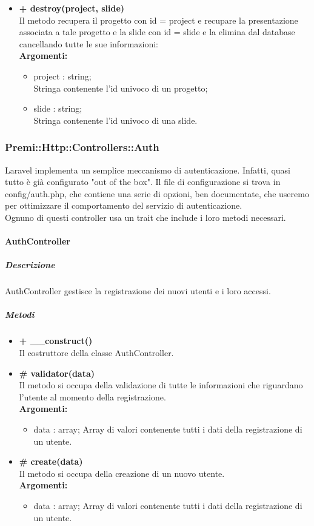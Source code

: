 \begin{itemize}
			\item \textbf{+ destroy(project, slide)}\\
				Il metodo recupera il progetto con id = project e recupare la presentazione associata a tale progetto e la slide con id = slide e la elimina dal database cancellando tutte le sue informazioni:\\
				\textbf{Argomenti:}
				\begin{itemize}
					\item project : string; \\
					Stringa contenente l'id univoco di un progetto;
					\item slide : string;\\
					Stringa contenente l'id univoco di una slide.
				\end{itemize}
\end{itemize}

\newpage
\subsubsection{Premi::Http::Controllers::Auth}
Laravel implementa un semplice meccanismo di autenticazione. Infatti, quasi tutto è già configurato "out of the box". Il file di configurazione si trova in config/auth.php, che contiene una serie di opzioni, ben documentate, che useremo per ottimizzare il comportamento del servizio di autenticazione.\\
Ognuno di questi controller usa un trait che include i loro metodi necessari.
	\paragraph{AuthController}
		\subparagraph{Descrizione}
			AuthController gestisce la registrazione dei nuovi utenti e i loro accessi.
		\subparagraph{Metodi}
			\begin{itemize}
				\item \textbf{+ \_\_construct()}\\
				Il costruttore della classe AuthController.
				\item \textbf{\# validator(data)}\\
				Il metodo si occupa della validazione di tutte le informazioni che riguardano l'utente al momento della registrazione.\\
					\textbf{Argomenti:}
						\begin{itemize}
							\item data : array;
							Array di valori contenente tutti i dati della registrazione di un utente. 
						\end{itemize}
				\item \textbf{\# create(data)}\\
				Il metodo si occupa della creazione di un nuovo utente.\\
					\textbf{Argomenti:}
						\begin{itemize}
							\item data : array;
							Array di valori contenente tutti i dati della registrazione di un utente.
						\end{itemize}
			\end{itemize}
			
